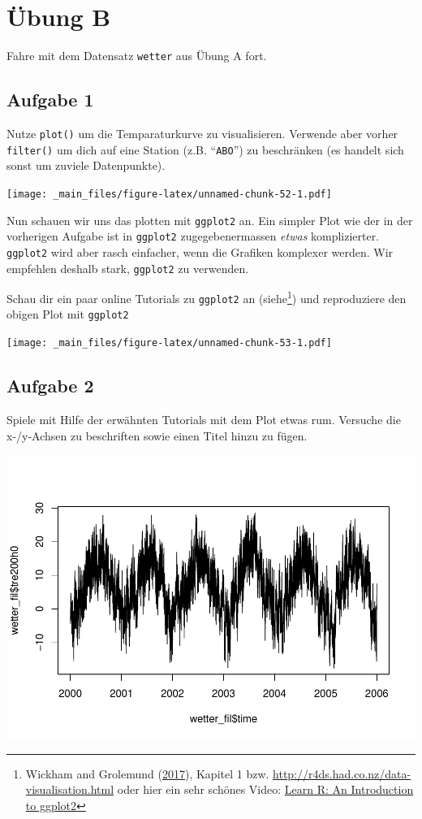 \documentclass[]{book}
\let\rmarkdownfootnote\footnote%
\def\footnote{\protect\rmarkdownfootnote}
\begin{document}
\hypertarget{ubung-b}{%
\section{Übung B}\label{ubung-b}}

Fahre mit dem Datensatz \texttt{wetter} aus Übung A fort.

\hypertarget{aufgabe-1-1}{%
\subsection{Aufgabe 1}\label{aufgabe-1-1}}

Nutze \texttt{plot()} um die Temparaturkurve zu visualisieren. Verwende aber vorher \texttt{filter()} um dich auf eine Station (z.B. ``\texttt{ABO}'') zu beschränken (es handelt sich sonst um zuviele Datenpunkte).

\texttt{[image: \_main\_files/figure-latex/unnamed-chunk-52-1.pdf]}

Nun schauen wir uns das plotten mit \texttt{ggplot2} an. Ein simpler Plot wie der in der vorherigen Aufgabe ist in \texttt{ggplot2} zugegebenermassen \emph{etwas} komplizierter. \texttt{ggplot2} wird aber rasch einfacher, wenn die Grafiken komplexer werden. Wir empfehlen deshalb stark, \texttt{ggplot2} zu verwenden.

Schau dir ein paar online Tutorials zu \texttt{ggplot2} an (siehe\footnote{Wickham and Grolemund (\protect\hyperlink{ref-wickham2017}{2017}), Kapitel 1 bzw. \url{http://r4ds.had.co.nz/data-visualisation.html} oder hier ein sehr schönes Video: \href{https://youtu.be/YxKr2a-Y1WE?t=1m40s}{Learn R: An Introduction to ggplot2}})
und reproduziere den obigen Plot mit \texttt{ggplot2}

\texttt{[image: \_main\_files/figure-latex/unnamed-chunk-53-1.pdf]}

\hypertarget{aufgabe-2-1}{%
\subsection{Aufgabe 2}\label{aufgabe-2-1}}

Spiele mit Hilfe der erwähnten Tutorials mit dem Plot etwas rum. Versuche die x-/y-Achsen zu beschriften sowie einen Titel hinzu zu fügen.

\includegraphics{_main_files/figure-latex/unnamed-chunk-54-1.pdf}
\end{document}
